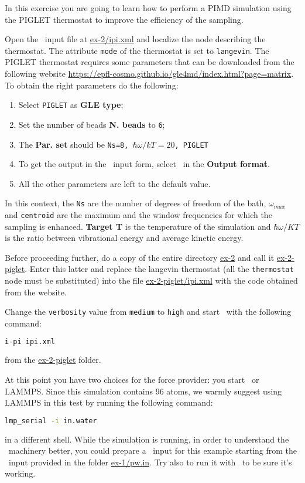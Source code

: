 \documentclass{article}
\begin{document}
\begin{Exercise}[label={inputs},title={Liquid water with the
    \emph{PIGLET} thermostat}]
In this exercise you are going to learn how to perform a PIMD
simulation using the PIGLET thermostat to improve the efficiency of
the sampling.

\Question
Open the \ipi\ input file at \url{ex-2/ipi.xml} and localize the node
describing the thermostat. The attribute \texttt{mode} of the
thermostat is set to \texttt{langevin}. The PIGLET thermostat requires
some parameters that can be downloaded from the following website
\url{https://epfl-cosmo.github.io/gle4md/index.html?page=matrix}.
To obtain the right parameters do the following:
\begin{enumerate}
\item Select \texttt{PIGLET} as \textbf{GLE type};
\item Set the number of beads \textbf{N. beads} to \texttt{6};
\item The \textbf{Par. set} should be \texttt{Ns=8,
    $\hbar\omega/kT=20$, PIGLET}
\item To get the output in the \ipi\ input form, select \ipi\ in the
  \textbf{Output format}.
\item All the other parameters are left to the default value.
\end{enumerate}
In this context, the \texttt{Ns} are the number of degrees of freedom
of the bath, $\omega_{max}$ and \texttt{centroid} are the maximum
and the window frequencies for which the sampling is
enhanced. \textbf{Target T} is the temperature of the simulation and
$\hbar\omega/KT$ is the ratio between vibrational energy and average
kinetic energy.

Before proceeding further, do a copy of the entire directory
\url{ex-2} and call it \url{ex-2-piglet}. Enter this latter and
replace the langevin thermostat (all the \texttt{thermostat} node must
be substituted) into the file \url{ex-2-piglet/ipi.xml} with the code
obtained from the website.

\Question
Change the \texttt{verbosity} value from \texttt{medium} to
\texttt{high} and start \ipi\ with the following command:
\begin{lstlisting}[language=bash]
i-pi ipi.xml
\end{lstlisting}
from the \url{ex-2-piglet} folder.

At this point you have two choices for the force provider: you start
\PWscf\ or LAMMPS. Since this simulation contains 96 atoms, we warmly
suggest using LAMMPS in this test by running the following command:
\begin{lstlisting}[language=bash]
lmp_serial -i in.water
\end{lstlisting}
in a different shell. While the simulation is running, in order to
understand the \ipi\ machinery better, you could prepare a \pwx\ input
for this example starting from the \pwx\ input provided in the folder
\url{ex-1/pw.in}. Try also to run it with \ipi\ to be sure it's working.


\end{Exercise}
\end{document}

